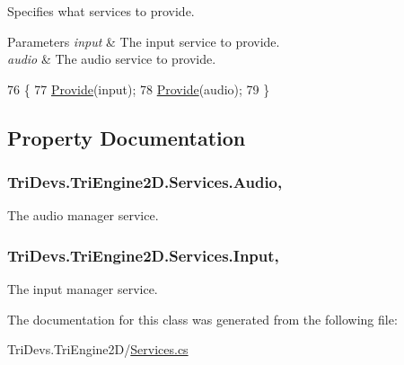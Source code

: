 Specifies what services to provide. 


\begin{DoxyParams}{Parameters}
{\em input} & The input service to provide.\\
\hline
{\em audio} & The audio service to provide.\\
\hline
\end{DoxyParams}

\begin{DoxyCode}
76         \{
77             \hyperlink{class_tri_devs_1_1_tri_engine2_d_1_1_services_a00f67457bccbe0ac69e969dc65181773}{Provide}(input);
78             \hyperlink{class_tri_devs_1_1_tri_engine2_d_1_1_services_a00f67457bccbe0ac69e969dc65181773}{Provide}(audio);
79         \}
\end{DoxyCode}


\subsection{Property Documentation}
\hypertarget{class_tri_devs_1_1_tri_engine2_d_1_1_services_a1201b69c627b2e951d9ec65f2d24eefa}{
\subsubsection[{Audio}]{ Tri\-Devs.\-Tri\-Engine2\-D.\-Services.\-Audio\hspace{0.3cm}{\ttfamily [static]}, {\ttfamily [get]}}}\label{class_tri_devs_1_1_tri_engine2_d_1_1_services_a1201b69c627b2e951d9ec65f2d24eefa}


The audio manager service. 

\hypertarget{class_tri_devs_1_1_tri_engine2_d_1_1_services_ab49cfe6c3d5dd9bd45b58b7599f1355d}{
\subsubsection[{Input}]{ Tri\-Devs.\-Tri\-Engine2\-D.\-Services.\-Input\hspace{0.3cm}{\ttfamily [static]}, {\ttfamily [get]}}}\label{class_tri_devs_1_1_tri_engine2_d_1_1_services_ab49cfe6c3d5dd9bd45b58b7599f1355d}


The input manager service. 



The documentation for this class was generated from the following file\-:\begin{DoxyCompactItemize}
\item 
Tri\-Devs.\-Tri\-Engine2\-D/\hyperlink{_services_8cs}{Services.\-cs}\end{DoxyCompactItemize}
